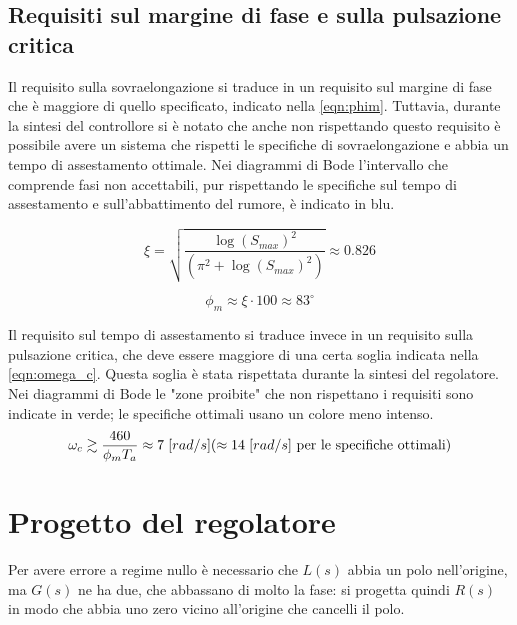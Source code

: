 \documentclass[a4paper]{article}
\begin{document}
\subsection{Requisiti sul margine di fase e sulla pulsazione critica}
Il requisito sulla sovraelongazione si traduce in un requisito sul margine di fase che è maggiore di quello specificato, indicato nella \cref{eqn:phim}.
Tuttavia, durante la sintesi del controllore si è notato che anche non rispettando questo requisito è possibile avere un sistema che rispetti le specifiche di sovraelongazione e abbia un tempo di assestamento ottimale.
Nei diagrammi di Bode l'intervallo che comprende fasi non accettabili, pur rispettando le specifiche sul tempo di assestamento e sull'abbattimento del rumore, è indicato in blu.

\begin{equation}
    \xi = \sqrt{\frac{\log(S_{max})^2}{(\pi^2+\log(S_{max})^2)}} \approx 0.826
    \label{eqn:xi}
\end{equation}

\begin{equation}
    \phi_m \approx \xi \cdot 100 \approx 83^\circ
    \label{eqn:phim}
\end{equation}

Il requisito sul tempo di assestamento si traduce invece in un requisito sulla pulsazione critica, che deve essere maggiore di una certa soglia indicata nella \cref{eqn:omega_c}.
Questa soglia è stata rispettata durante la sintesi del regolatore.
Nei diagrammi di Bode le "zone proibite" che non rispettano i requisiti sono indicate in verde; le specifiche ottimali usano un colore meno intenso.
\begin{equation}
    \omega_c \gtrsim \frac{460}{\phi_m T_a} \approx 7 \hspace{0.3em} [rad/s] (\approx 14 \hspace{0.3em} [rad/s] \textrm{ per le specifiche ottimali})
    \label{eqn:omega_c}
\end{equation}

\section{Progetto del regolatore}

Per avere errore a regime nullo è necessario che $L(s)$ abbia un polo nell'origine, ma $G(s)$ ne ha due, che abbassano di molto la fase: si progetta quindi $R(s)$ in modo che abbia uno zero vicino all'origine che cancelli il polo.
\end{document}
